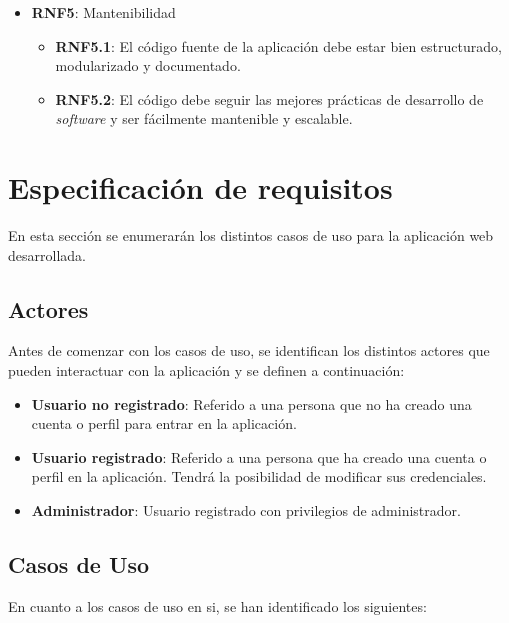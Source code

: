 \begin{itemize}
  \item \textbf{RNF5}: Mantenibilidad
  \begin{itemize}
    \item \textbf{RNF5.1}: El código fuente de la aplicación debe estar bien estructurado, modularizado y documentado.
    \item \textbf{RNF5.2}: El código debe seguir las mejores prácticas de desarrollo de \textit{software} y ser fácilmente mantenible y escalable.
  \end{itemize}
\end{itemize}


\section{Especificación de requisitos}
\label{sec:Especificación de requisitos}

En esta sección se enumerarán los distintos casos de uso para la aplicación web desarrollada.

\subsection{Actores}
Antes de comenzar con los casos de uso, se identifican los distintos actores que pueden interactuar con la aplicación y se definen a continuación:
\begin{itemize}
    \item \textbf{Usuario no registrado}: Referido a una persona que no ha creado una cuenta o perfil para entrar en la aplicación.
    \item \textbf{Usuario registrado}: Referido a una persona que ha creado una cuenta o perfil en la aplicación. Tendrá la posibilidad de modificar sus credenciales.
    \item \textbf{Administrador}: Usuario registrado con privilegios de administrador.
\end{itemize}

\subsection{Casos de Uso}
En cuanto a los casos de uso en si, se han identificado los siguientes:

